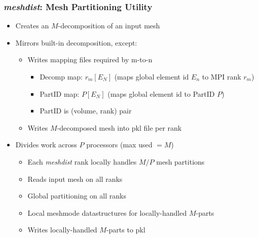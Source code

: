 \begin{frame}\frametitle{\textit{meshdist}: \mirgecom{} Mesh Partitioning Utility}
\begin{itemize}
\item Creates an $M$-decomposition of an input mesh
\item Mirrors built-in decomposition, except:
  \begin{itemize}
  \item Writes mapping files required by m-to-n
    \begin{itemize}
    \item Decomp map: $r_m[E_N]$  (maps global element id $E_n$ to MPI rank $r_m$)
    \item PartID map: $P[E_N]$ (maps global element id to PartID $P$)
    \item PartID is (volume, rank) pair
    \end{itemize}
  \item Writes $M$-decomposed mesh into pkl file per rank
  \end{itemize}
\item Divides work across $P$ processors (max used $= M$)
\begin{itemize}
\item Each \textit{meshdist} rank locally handles $M / P$ mesh partitions
\item Reads input mesh on all ranks
\item Global partitioning on all ranks
\item Local meshmode datastructures for locally-handled $M$-parts
\item Writes locally-handled $M$-parts to pkl
\end{itemize}
\end{itemize}
\end{frame}

